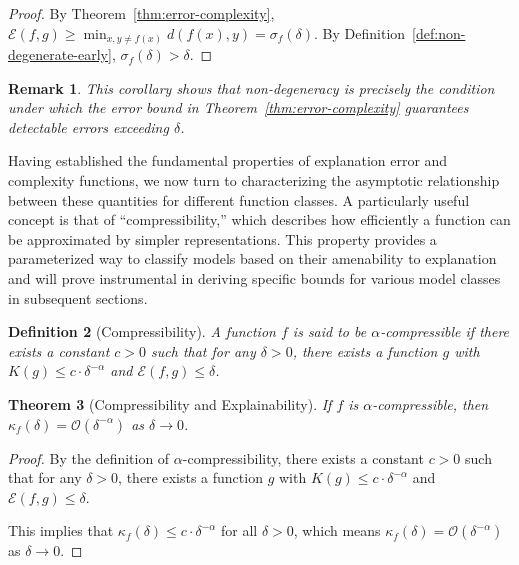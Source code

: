 \documentclass[11pt,letter,leqno]{article}
\newtheorem{theorem}{Theorem}[section]
\newtheorem{definition}[theorem]{Definition}
\newtheorem{remark}[theorem]{Remark}
\begin{document}
\begin{proof}
By Theorem~\ref{thm:error-complexity}, 
$\mathcal{E}(f,g) \geq \min_{x,y \neq f(x)} d(f(x),y) = \sigma_f(\delta)$. 
By Definition~\ref{def:non-degenerate-early}, $\sigma_f(\delta) > \delta$. 
\end{proof}

\begin{remark}
This corollary shows that non-degeneracy is precisely the condition under which 
the error bound in Theorem~\ref{thm:error-complexity} guarantees detectable 
errors exceeding $\delta$.
\end{remark}

Having established the fundamental properties of explanation error and complexity functions, we now turn to characterizing the asymptotic relationship between these quantities for different function classes.  A particularly useful concept is that of ``compressibility,'' which describes how efficiently a function can be approximated by simpler representations.  This property provides a parameterized way to classify models based on their amenability to explanation and will prove instrumental in deriving specific bounds for various model classes in subsequent sections.

\begin{definition}[Compressibility]
\label{def:compressibility}
A function $f$ is said to be $\alpha$-compressible if there exists a constant $c > 0$ such that for any $\delta > 0$, there exists a function $g$ with $K(g) \leq c \cdot \delta^{-\alpha}$ and $\mathcal{E}(f, g) \leq \delta$.
\end{definition}

\begin{theorem}[Compressibility and Explainability]
\label{thm:compressibility}
If $f$ is $\alpha$-compressible, then $\kappa_f(\delta) = \mathcal{O}(\delta^{-\alpha})$ as $\delta \to 0$.
\end{theorem}

\begin{proof}
By the definition of $\alpha$-compressibility, there exists a constant $c > 0$ such that for any $\delta > 0$, there exists a function $g$ with $K(g) \leq c \cdot \delta^{-\alpha}$ and $\mathcal{E}(f, g) \leq \delta$.

This implies that $\kappa_f(\delta) \leq c \cdot \delta^{-\alpha}$ for all $\delta > 0$, which means $\kappa_f(\delta) = \mathcal{O}(\delta^{-\alpha})$ as $\delta \to 0$.
\end{proof}
\end{document}
